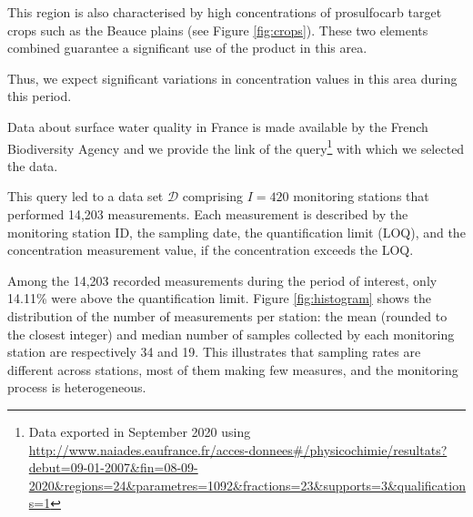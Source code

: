 This region is also characterised by high concentrations of prosulfocarb target crops such as the Beauce plains (see Figure \ref{fig:crops}). These two elements combined guarantee a significant use of the product in this area.  

Thus, we expect significant variations in concentration values in this area during this period. 

Data about surface water quality in France is made available by the French Biodiversity Agency \cite{Naiade} and we provide the link of the query\footnote{Data exported in September 2020 using \\ \url{http://www.naiades.eaufrance.fr/acces-donnees\#/physicochimie/resultats?debut=09-01-2007&fin=08-09-2020&regions=24&parametres=1092&fractions=23&supports=3&qualifications=1}} with which we selected the data.

This query led to a data set $\mathcal D$ comprising $I = 420$ monitoring stations that performed 14,203 measurements. Each measurement is described by the monitoring station ID, the sampling date, the quantification limit (LOQ), and the concentration measurement value, if the concentration exceeds the LOQ. 


Among the 14,203 recorded measurements during the period of interest, only 14.11\% were above the quantification limit. Figure \ref{fig:histogram} shows the distribution of the number of measurements per station: the mean (rounded to the closest integer) and median number of samples collected by each monitoring station are respectively 34 and 19. This illustrates that sampling rates are different across stations, most of them making few measures, and the monitoring process is heterogeneous.


